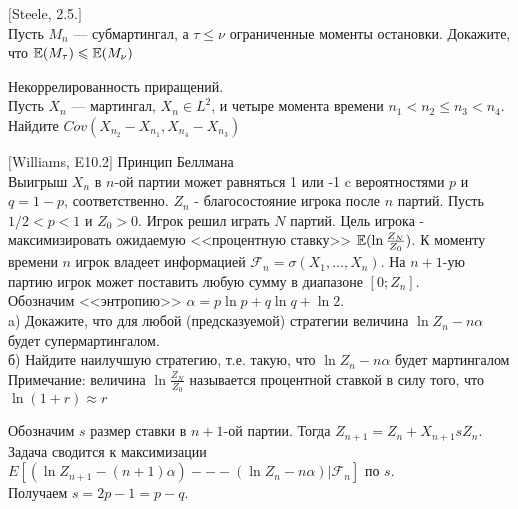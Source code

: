 \begin{solution}
\begin{solution}
\begin{solution}
\begin{solution}
\begin{solution}
\begin{solution}
\begin{solution}
\begin{solution}
\begin{solution}
\end{solution}

\begin{problem}
$[$Steele, 2.5.$]$ \\
Пусть $M_{n}$ --- субмартингал, а $\tau\le\nu$ ограниченные моменты
остановки. Докажите, что $\mathbb{E}(M_{\tau})\leqslant \mathbb{E}(M_{\nu})$ 
\end{problem} 
\begin{solution} 

\end{solution}

\begin{problem}
Некоррелированность приращений. \\
Пусть $X_{n}$ --- мартингал, $X_{n}\in L^{2}$, и четыре момента
времени $n_{1}<n_{2}\le n_{3}<n_{4}$. \\
Найдите $Cov(X_{n_{2}}-X_{n_{1}},X_{n_{4}}-X_{n_{3}})$ 
\end{problem} 
\begin{solution} 

\end{solution}

\begin{problem}
$[$Williams, E10.2$]$ Принцип Беллмана \\
Выигрыш $X_{n}$ в $n$-ой партии может равняться 1 или -1 c
вероятностями $p$ и $q=1-p$, соответственно. $Z_{n}$ -
благосостояние игрока после $n$ партий. Пусть $1/2<p<1$ и
$Z_{0}>0$. Игрок решил играть $N$ партий. Цель игрока -
максимизировать ожидаемую <<процентную ставку>>
$\mathbb{E}(\ln\frac{Z_{N}}{Z_{0}})$. К моменту времени $n$ игрок владеет
информацией $\mathcal{F}_{n}=\sigma(X_{1},\ldots,X_{n})$. На $n+1$-ую
партию игрок может поставить любую сумму в диапазоне $[0;Z_{n}]$.
\\
Обозначим <<энтропию>> $\alpha=p\ln p+q\ln q+\ln 2$. \\
a) Докажите, что для любой (предсказуемой) стратегии величина $\ln
Z_{n}-n\alpha$ будет супермартингалом. \\
б) Найдите наилучшую стратегию, т.е. такую, что $\ln
Z_{n}-n\alpha$ будет мартингалом \\
Примечание: величина $\ln\frac{Z_{N}}{Z_{0}}$ называется
процентной ставкой в силу того, что $\ln(1+r)\approx r$ 
\end{problem} 
\begin{solution} 

Обозначим $s$ размер ставки в $n+1$-ой партии. Тогда
$Z_{n+1}=Z_{n}+X_{n+1}sZ_{n}$. \\
Задача сводится к максимизации $E[(\ln Z_{n+1}-(n+1)\alpha) --- (\ln
Z_{n}-n\alpha)|\mathcal{F}_{n}]$ по $s$. \\
Получаем $s=2p-1=p-q$. 
\end{solution}


\end{solution}
\end{solution}
\end{solution}
\end{solution}
\end{solution}
\end{solution}
\end{solution}
\end{solution}
